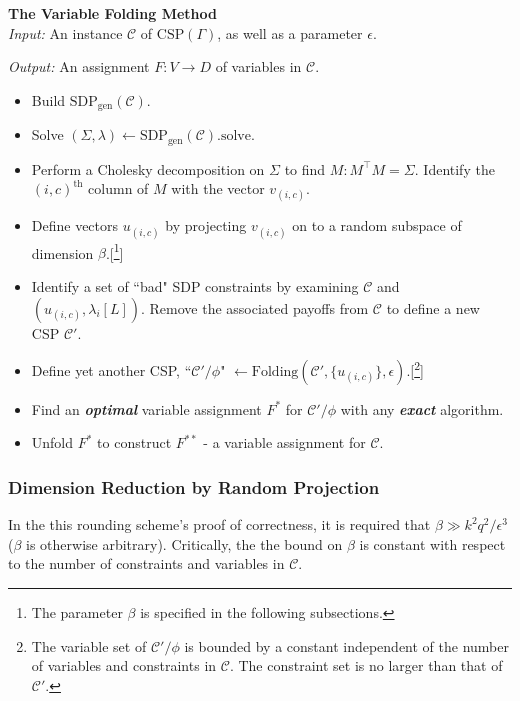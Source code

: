 \documentclass[letterpaper, 12pt]{article}
\numberwithin{equation}{section}
\begin{document}
\begin{algorithm} \textbf{The Variable Folding Method} \\

\textit{Input: } An instance $\mathcal{C}$ of $\text{CSP}(\Gamma)$, as well as a parameter $\epsilon$.

\textit{Output: } An assignment $F : V \to D$ of variables in $\mathcal{C}$.
\begin{itemize}
\item Build $\text{SDP}_{\text{gen}}(\mathcal{C})$.
\item Solve $(\Sigma,\lambda) \leftarrow \text{SDP}_{\text{gen}}(\mathcal{C}).\text{solve}$.
\item Perform a Cholesky decomposition on $\Sigma$ to find $M : M^\intercal M = \Sigma$. Identify the $(i,c)^{\text{th}}$ column of $M$ with the vector $v_{(i,c)}$.
\item Define vectors $u_{(i,c)}$ by projecting $v_{(i,c)}$ on to a random subspace of dimension $\beta$.[\footnote{The parameter $\beta$ is specified in the following subsections.}]
\item Identify a set of ``bad" SDP constraints by examining $\mathcal{C}$ and $(u_{(i,c)},\lambda_i[L])$. Remove the associated payoffs from $\mathcal{C}$ to define a new CSP $\mathcal{C}'$.
\item Define yet another CSP, ``$\mathcal{C}'/\phi$" $\leftarrow \text{Folding}(\mathcal{C}',\{u_{(i,c)}\},\epsilon)$.[\footnote{The variable set of  $\mathcal{C}'/\phi$ is bounded by a constant independent of the number of variables and constraints in $\mathcal{C}$. The constraint set is no larger than that of $\mathcal{C}'$.}]
\item Find an \textit{\textbf{optimal}} variable assignment $F^*$ for $\mathcal{C}'/\phi$ with any \textit{\textbf{exact}} algorithm.
\item Unfold $F^*$ to construct $F^{**}$ - a variable assignment for $\mathcal{C}$.
\end{itemize}
\end{algorithm}

\subsubsection{Dimension Reduction by Random Projection}
In the this rounding scheme's proof of correctness, it is required that $ \beta \gg k^2q^2/\epsilon^3$ ($\beta$ is otherwise arbitrary). Critically, the the bound on $\beta$ is constant with respect to the number of constraints and variables in $\mathcal{C}$. 
\end{document}
